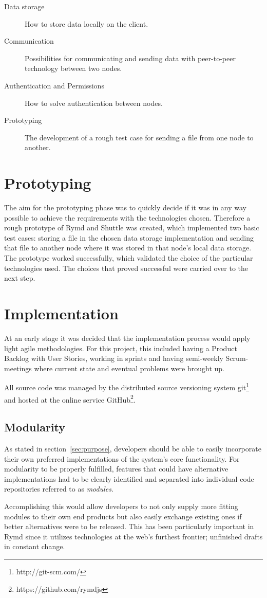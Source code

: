 \begin{description}
\item[Data storage] How to store data locally on the client.
\item[Communication] Possibilities for communicating and sending data with peer-to-peer technology between two nodes.
\item[Authentication and Permissions] How to solve authentication between nodes.
\item[Prototyping] The development of a rough test case for sending a file from one node to another.
\end{description}

\section{Prototyping}

The aim for the prototyping phase was to quickly decide if it was in any way possible to achieve the requirements with the technologies chosen. Therefore a rough prototype of Rymd and Shuttle was created, which implemented two basic test cases: storing a file in the chosen data storage implementation and sending that file to another node where it was stored in that node's local data storage. The prototype worked successfully, which validated the choice of  the particular technologies used. The choices that proved successful were carried over to the next step.

\section{Implementation}

At an early stage it was decided that the implementation process would apply light agile methodologies. For this project, this included having a Product Backlog with User Stories, working in sprints and having semi-weekly Scrum-meetings where current state and eventual problems were brought up.

All source code was managed by the distributed source versioning system git\footnote{http://git-scm.com/} and hosted at the online service GitHub\footnote{https://github.com/rymdjs}.

\subsection{Modularity}
\label{sec:modularity}

As stated in section~\ref{sec:purpose}, developers should be able to easily incorporate their own preferred implementations of the system's core functionality. For modularity to be properly fulfilled, features that could have alternative implementations had to be clearly identified and separated into individual code repositories referred to as \emph{modules}.

Accomplishing this would allow developers to not only supply more fitting modules to their own end products but also easily exchange existing ones if better alternatives were to be released. This has been particularly important in Rymd since it utilizes technologies at the web's furthest frontier; unfinished drafts in constant change.
